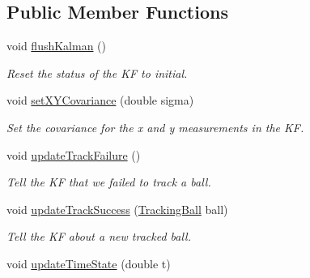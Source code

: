 \subsection*{Public Member Functions}
\begin{DoxyCompactItemize}
\item 
void \hyperlink{classBallTrackingFilter_a3b79dc230092e91b79b667eb2907b892}{flush\+Kalman} ()\hypertarget{classBallTrackingFilter_a3b79dc230092e91b79b667eb2907b892}{}\label{classBallTrackingFilter_a3b79dc230092e91b79b667eb2907b892}

\begin{DoxyCompactList}\small\item\em Reset the status of the KF to initial. \end{DoxyCompactList}\item 
void \hyperlink{classBallTrackingFilter_a1f7a9079bbbf4f78645da2271cead68c}{set\+X\+Y\+Covariance} (double sigma)\hypertarget{classBallTrackingFilter_a1f7a9079bbbf4f78645da2271cead68c}{}\label{classBallTrackingFilter_a1f7a9079bbbf4f78645da2271cead68c}

\begin{DoxyCompactList}\small\item\em Set the covariance for the x and y measurements in the KF. \end{DoxyCompactList}\item 
void \hyperlink{classBallTrackingFilter_a3e6a931411e704397da39f331eaacd9a}{update\+Track\+Failure} ()\hypertarget{classBallTrackingFilter_a3e6a931411e704397da39f331eaacd9a}{}\label{classBallTrackingFilter_a3e6a931411e704397da39f331eaacd9a}

\begin{DoxyCompactList}\small\item\em Tell the KF that we failed to track a ball. \end{DoxyCompactList}\item 
void \hyperlink{classBallTrackingFilter_a560b9fc3368535ef2a3f86a338dbe814}{update\+Track\+Success} (\hyperlink{classTrackingBall}{Tracking\+Ball} ball)\hypertarget{classBallTrackingFilter_a560b9fc3368535ef2a3f86a338dbe814}{}\label{classBallTrackingFilter_a560b9fc3368535ef2a3f86a338dbe814}

\begin{DoxyCompactList}\small\item\em Tell the KF about a new tracked ball. \end{DoxyCompactList}\item 
void \hyperlink{classBallTrackingFilter_ac51def54184a6b5064cda7336d6c7b59}{update\+Time\+State} (double t)\hypertarget{classBallTrackingFilter_ac51def54184a6b5064cda7336d6c7b59}{}\label{classBallTrackingFilter_ac51def54184a6b5064cda7336d6c7b59}


\end{DoxyCompactItemize}
